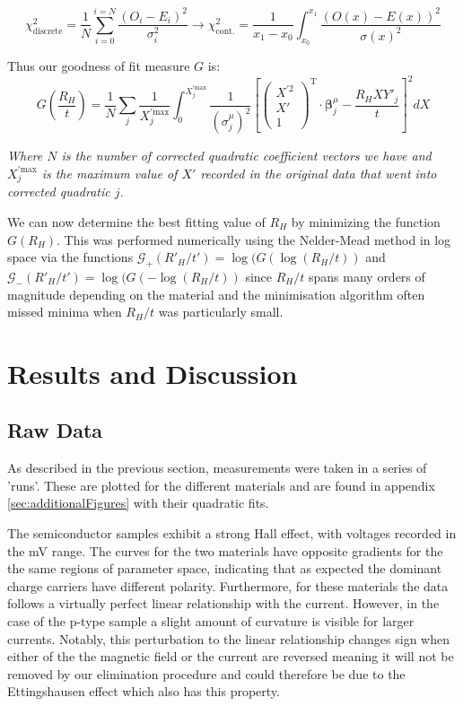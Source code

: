 \documentclass[a4paper]{article}
\begin{document}
		\begin{equation}
			\chi^2_{\textrm{discrete}} = \frac{1}{N}\sum_{i=0}^{i=N}\frac{(O_i-E_i)^2}{\sigma_i^2} \rightarrow \chi^2_{\textrm{cont.}} = \frac{1}{x_1-x_0}\int_{x_0}^{x_1}\frac{(O(x)-E(x))^2}{\sigma(x)^2}
		\end{equation}
		
		\noindent Thus our goodness of fit measure $G$ is:
		\begin{equation} \label{eq:fitness}
			G\left(\frac{R_H}{t}\right) = \frac{1}{N}\sum_j\frac{1}{X^{\prime \textrm{max}}_j}\int_{0}^{X^{\prime \textrm{max}}_j}\frac{1}{(\sigma^\mu_j)^2}\left[\begin{pmatrix}X^{\prime2} \\ X' \\ 1\end{pmatrix}^\mathrm{T}\cdot\boldsymbol{\beta}^\mu_j - \frac{R_HXY'_j}{t}\right]^2 dX
		\end{equation}
		\begin{center} \emph{Where $N$ is the number of corrected quadratic coefficient vectors we have and $X^{\prime \textrm{max}}_j$ is the maximum value of $X'$ recorded in the original data that went into corrected quadratic $j$.} \end{center}
		
		We can now determine the best fitting value of $R_H$ by minimizing the function $G(R_H)$. This was performed numerically using the Nelder-Mead method in log space via the functions $\mathcal{G_+}(R'_H/t') = \log(G(\log(R_H/t))$ and $\mathcal{G_-}(R'_H/t') = \log(G(-\log(R_H/t))$ since $R_H/t$ spans many orders of magnitude depending on the material and the minimisation algorithm often missed minima when $R_H/t$ was particularly small.
	
	\section{Results and Discussion}
		\subsection{Raw Data}
			As described in the previous section, measurements were taken in a series of 'runs'. These are plotted for the different materials and are found in appendix \ref{sec:additionalFigures} with their quadratic fits.
			
			The semiconductor samples exhibit a strong Hall effect, with voltages recorded in the mV range. The curves for the two materials have opposite gradients for the the same regions of parameter space, indicating that as expected the dominant charge carriers have different polarity. Furthermore, for these materials the data follows a virtually perfect linear relationship with the current. However, in the case of the p-type sample a slight amount of curvature is visible for larger currents. Notably, this perturbation to the linear relationship changes sign when either of the the magnetic field or the current are reversed meaning it will not be removed by our elimination procedure and could therefore be due to the Ettingshausen effect which also has this property.
			
\end{document}
